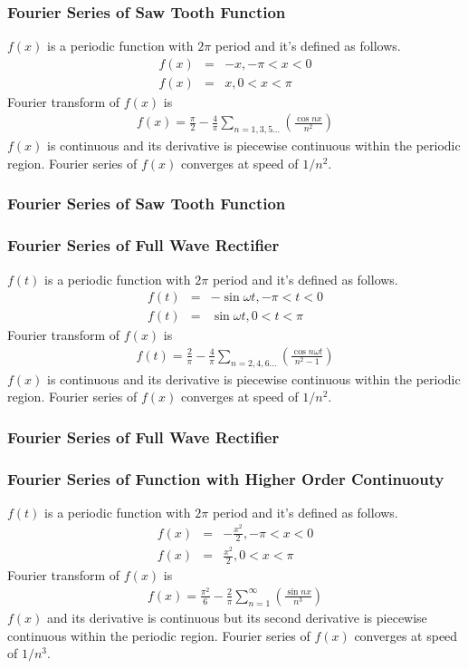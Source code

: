 \documentclass{beamer}
\begin{document}
\begin{frame}
\frametitle{Fourier Series of Saw Tooth Function}
$f(x)$ is a periodic function with $2\pi$ period and it's defined as follows.
\begin{eqnarray}
f(x)&=& -x, -\pi < x < 0 \nonumber \\
f(x)&=& x, 0 < x < \pi
\label{eq:sawfunc}
\end{eqnarray}
Fourier transform of $f(x)$ is
\begin{eqnarray}
f(x)= \frac{\pi}{2} - \frac{4}{\pi} \sum_{n=1,3,5...} \left( \frac{\cos nx}{n^2} \right)
\label{eq:sawfunc_ft}
\end{eqnarray}
$f(x)$ is continuous and its derivative is piecewise continuous within the periodic region. Fourier series of $f(x)$ converges at speed of $1/n^2$.
\end{frame}
\begin{frame}
\frametitle{Fourier Series of Saw Tooth Function}
\end{frame}
\begin{frame}
\frametitle{Fourier Series of Full Wave Rectifier}
$f(t)$ is a periodic function with $2\pi$ period and it's defined as follows.
\begin{eqnarray}
f(t)&=& -\sin {\omega t}, -\pi < t < 0 \nonumber \\
f(t)&=& \sin {\omega t}, 0 < t < \pi
\label{eq:fullrectifier_func}
\end{eqnarray}
Fourier transform of $f(x)$ is
\begin{eqnarray}
f(t)= \frac{2}{\pi} - \frac{4}{\pi} \sum_{n=2,4,6...} \left( \frac{\cos n\omega t}{n^2 - 1} \right)
\label{eq:fullrectifier_func_ft}
\end{eqnarray}
$f(x)$ is continuous and its derivative is piecewise continuous within the periodic region. Fourier series of $f(x)$ converges at speed of $1/n^2$.
\end{frame}
\begin{frame}
\frametitle{Fourier Series of Full Wave Rectifier}
\end{frame}
\begin{frame}[hide]
\frametitle{Fourier Series of Function with Higher Order Continuouty}
$f(t)$ is a periodic function with $2\pi$ period and it's defined as follows.
\begin{eqnarray}
f(x)&=& -\frac{x^2}{2}, -\pi < x < 0 \nonumber \\
f(x)&=& \frac{x^2}{2}, 0 < x < \pi
\label{eq:higerorderfunc}
\end{eqnarray}
Fourier transform of $f(x)$ is
\begin{eqnarray}
f(x)= \frac{\pi^2}{6} - \frac{2}{\pi} \sum_{n=1}^{\infty} \left( \frac{\sin nx}{n^3} \right)
\label{eq:higerorderfunc_ft}
\end{eqnarray}
$f(x)$ and its derivative is continuous but its second derivative is piecewise continuous within the periodic region. Fourier series of $f(x)$ converges at speed of $1/n^3$.
\end{frame}
\end{document}
